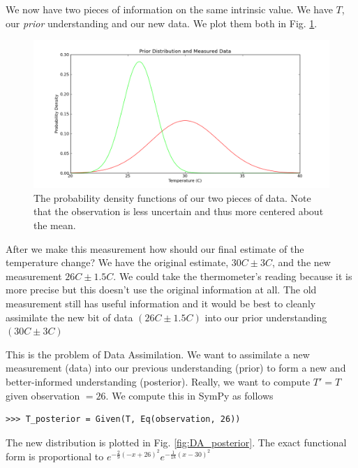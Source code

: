 We now have two pieces of information on the same intrinsic value. We have $T$, our \textit{prior} understanding and our new data. We plot them both in Fig. \ref{fig:DA_data}. 

\begin{figure}[ht]
\vspace{-0pt}
\centering
\includegraphics[width=.7\textwidth]{images/data.png}
\vspace{-0pt}
\caption{The probability density functions of our two pieces of data. Note that the observation is less uncertain and thus more centered about the mean.}
\label{fig:DA_data}
\vspace{00pt}
\end{figure}

After we make this measurement how should our final estimate of the temperature change? We have the original estimate, $30C \pm 3C$, and the new measurement $26C \pm 1.5C$. We could take the thermometer’s reading because it is more precise but this doesn’t use the original information at all. The old measurement still has useful information and it would be best to cleanly assimilate the new bit of data $(26C \pm 1.5C)$ into our prior understanding $(30C \pm 3C)$

This is the problem of Data Assimilation. We want to assimilate a new measurement (data) into our previous understanding (prior) to form a new and better-informed understanding (posterior). Really, we want to compute $T' = T$ given observation $= 26$. We compute this in SymPy as follows

\begin{lstlisting}
>>> T_posterior = Given(T, Eq(observation, 26))
\end{lstlisting}

The new distribution is plotted in Fig. \ref{fig:DA_posterior}. The exact functional form is proportional to $e^{-\frac{2}{9} \left(-x + 26\right)^{2}} e^{-\frac{1}{18} \left(x-30\right)^{2}}$ 

